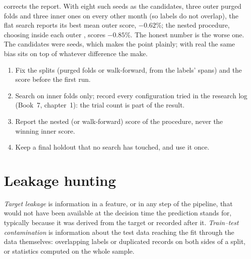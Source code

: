  corrects the report. With eight such seeds as the candidates, three outer purged folds and three
inner ones on every other month (so labels do not overlap), the flat search reports its best mean outer score,
$-0.62\%$; the nested procedure, choosing inside each outer , scores $-0.85\%$. The honest number is the
worse one. The candidates were seeds, which makes the point plainly; with real  the same bias sits on
top of whatever difference the  make.

\begin{method}\label{met:ml:validation:search}
\begin{enumerate}
\item Fix the splits (purged folds or walk-forward, from the labels' spans) and the score before the first run.
\item Search on inner folds only; record every configuration tried in the research log (Book~7, chapter~1): the trial
count is part of the result.
\item Report the nested (or walk-forward) score of the procedure, never the winning inner score.
\item Keep a final holdout that no search has touched, and use it once.
\end{enumerate}
\end{method}

\section{Leakage hunting}

\begin{definition}\label{def:ml:validation:leakage}
\emph{Target leakage} is information in a feature, or in any step of the pipeline, that would not
have been available at the decision time the prediction stands for, typically because it was derived from the target
or recorded after it. \emph{Train--test contamination} is information about the test
data reaching the fit through the data themselves: overlapping labels or duplicated records on both sides of a split,
or statistics computed on the whole sample.
\end{definition}

